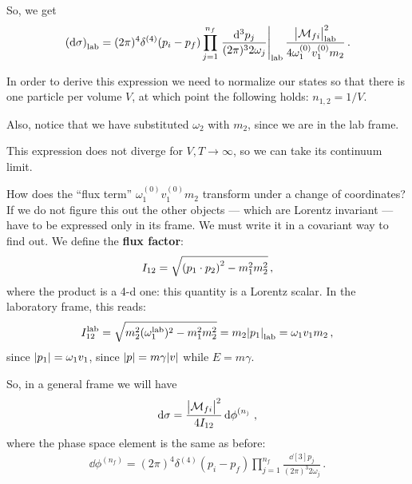 \documentclass[main.tex]{subfiles}
\begin{document}
So, we get 
%
\begin{align}
\qty(\dd{\sigma }) _{\text{lab}} =
(2 \pi )^{4} \delta^{(4)} (p_i - p_f) 
\prod_{j=1}^{n_f} 
\eval{\frac{ \dd[3]{p_j}}{(2 \pi )^3 2 \omega_{j}}}_{\text{lab}}
\frac{\abs{\mathcal{M}_{fi}}^2 _{\text{lab}}}{4 \omega^{(0)}_{1} v_1^{(0)} m_2 }  
\,.
\end{align}

In order to derive this expression we need to normalize our states so that there is one particle per volume \(V\), at which point the following holds: \(n_{1, 2} = 1/ V\). 

Also, notice that we have substituted \(\omega_2 \) with \(m_2 \), since we are in the lab frame. 

This expression does not diverge for \(V, T \to \infty \), so we can take its continuum limit. 


How does the ``flux term'' \(\omega^{(0)}_{1} v_1^{(0)} m_2\) transform under a change of coordinates? If we do not figure this out the other objects --- which are Lorentz invariant --- have to be expressed only in its frame.
We must write it in a covariant way to find out. We define the \textbf{flux factor}: 
%
\begin{align}
I_{12} = \sqrt{\qty(p_1 \cdot p_2 )^2 - m_1^2 m_2^2 }
\,,
\end{align}
%
where the product is a 4-d one: this quantity is a Lorentz scalar.
In the laboratory frame, this reads: 
%
\begin{align}
I_{12}^{\text{lab}} = \sqrt{m_2^2 (\omega_1^{\text{lab}})^2 -m_1^2 m_2^2}
= m_2 \abs{p_1 }_{\text{lab}} = \omega_{1} v_1 m_2
\,,
\end{align}
%
since \(\abs{p_1 } = \omega_1 v_1 \), since \(\abs{p} = m \gamma \abs{v} \) while \(E = m \gamma \). 

So, in a general frame we will have 
%
\begin{align}
\dd{\sigma } = \frac{\abs{\mathcal{M}_{fi}}^2}{4 I_{12} } \dd{\phi}^{(n_)}
\,,
\end{align}
%
where the phase space element is the same as before: 
%
\begin{align}
\dd{\phi}^{(n_f)} = 
(2 \pi )^{4}
\delta^{(4)} (p_i - p_f)
\prod_{j=1}^{n_f} \frac{ \dd[3]{p_j}}{(2 \pi)^3 2 \omega_{j}}
\,.
\end{align}
\end{document}
